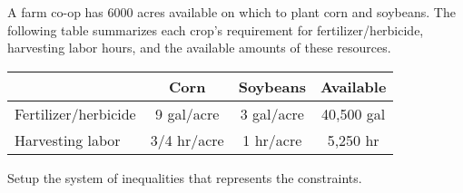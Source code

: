 \documentclass[../mathNotesPreamble]{subfiles}
\begin{document}
  \begin{center}
  \end{center}
  \begin{ex*}
    A farm co-op has 6000 acres available on which to plant corn and soybeans. The following table summarizes each crop's requirement for fertilizer/herbicide, harvesting labor hours, and the available amounts of these resources.
    \begin{center}
      \begin{tabular}{@{}lccc@{}}\toprule
        & \textbf{Corn}& \textbf{Soybeans}& \textbf{Available}\\\midrule
        Fertilizer/herbicide& 9 gal/acre& 3 gal/acre& 40,500 gal\\
        Harvesting labor& 3/4 hr/acre& 1 hr/acre& 5,250 hr\\\bottomrule
      \end{tabular}
    \end{center}
    Setup the system of inequalities that represents the constraints.
  \end{ex*}
\end{document}
